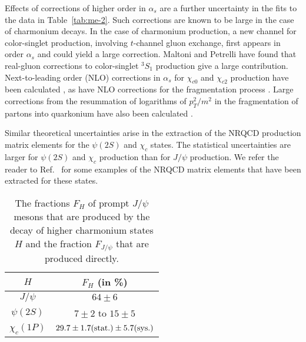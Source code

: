 Effects of corrections of higher order in $\alpha_s$ are a further
uncertainty in the fits to the data in Table~\ref{tab:me-2}. Such
corrections are known to be large in the case of charmonium decays. In
the case of charmonium production, a new channel for color-singlet
production, involving $t$-channel gluon exchange, first appears in order
$\alpha_s$ and could yield a large correction. Maltoni and Petrelli
\cite{Petrelli:1999rh} have found that real-gluon corrections to
color-singlet ${}^3S_1$ production give a large contribution.
Next-to-leading order (NLO) corrections in $\alpha_s$ for 
$\chi_{c0}$ and $\chi_{c2}$
production have been calculated \cite{Petrelli:1997ge}, as have
NLO corrections for the fragmentation process
\cite{Beneke:1995yb,Ma:1995ci,Braaten:2000pc}. Large corrections from
the resummation of logarithms of $p_T^2/m^2$ in the fragmentation of
partons into quarkonium have also been calculated
\cite{Cacciari:1994dr,Braaten:1994xb,Roy:1994ie,Sanchis-Lozano:1999um}.

Similar theoretical uncertainties arise in the extraction of the NRQCD
production matrix elements for the $\psi(2S)$ and $\chi_c$ states. The
statistical uncertainties are larger for $\psi(2S)$ and $\chi_c$
production than for $J/\psi$ production. We refer the reader to
Ref.~\cite{Kramer:2001hh} for some examples of the NRQCD matrix elements
that have been extracted for these states.

\begin{table}[ht]
\begin{center}
\begin{tabular}{|c|c|} 
\hline \hline
$H$ & $F_H$ (in \%) \\ 
\hline
$J/\psi$        & $64 \pm 6$ \\ 
$\psi(2S)$      & $7 \pm 2$ to $15\pm 5$ \\ 
$\chi_c(1P)$    & $29.7 \pm 1.7(\hbox{stat.}) \pm 5.7(\hbox{sys.})$ \\
\hline \hline
\end{tabular}
\caption{The fractions $F_H$ of prompt $J/\psi$ mesons
that are produced by the decay of higher charmonium states $H$
and the fraction $F_{J/\psi}$ that are produced directly.}
\label{prodsec:Jpsifractions}
\end{center}
\end{table}

